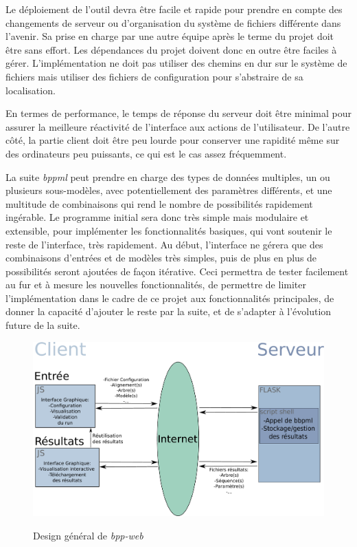 Le déploiement de l'outil devra être facile et rapide
pour prendre en compte des changements de serveur
ou d'organisation du système de fichiers différente dans l'avenir.
Sa prise en charge par une autre équipe après le terme du projet
doit être sans effort.
Les dépendances du projet doivent donc en outre
être faciles à gérer.
L'implémentation ne doit pas utiliser des chemins en dur sur le système de fichiers
mais utiliser des fichiers de configuration
pour s'abstraire de sa localisation.

En termes de performance,
le temps de réponse du serveur doit être minimal
pour assurer la meilleure réactivité de l'interface aux actions de l'utilisateur.
De l'autre côté, la partie client doit être peu lourde
pour conserver une rapidité même sur des ordinateurs peu puissants,
ce qui est le cas assez fréquemment.

La suite \textit{bppml} peut prendre en charge
des types de données multiples, un ou plusieurs sous-modèles,
avec potentiellement des paramètres différents,
et une multitude de combinaisons
qui rend le nombre de possibilités rapidement ingérable.
Le programme initial sera donc très simple mais modulaire et extensible,
pour implémenter les fonctionnalités basiques,
qui vont soutenir le reste de l'interface,
très rapidement.
Au début, l'interface ne gérera que
des combinaisons d'entrées et de modèles très simples,
puis de plus en plus de possibilités seront ajoutées de façon itérative.
Ceci permettra
de tester facilement au fur et à mesure les nouvelles fonctionnalités,
de permettre de limiter l'implémentation dans le cadre de ce projet
aux fonctionnalités principales,
de donner la capacité d'ajouter le reste par la suite,
et de s'adapter à l'évolution future de la suite.

\begin{figure}
	\caption{Design général de \textit{bpp-web}}
	\includegraphics[scale=0.5]{fig/SchemaConcept.pdf}
	\centering
	\label{fig:des}
\end{figure}


